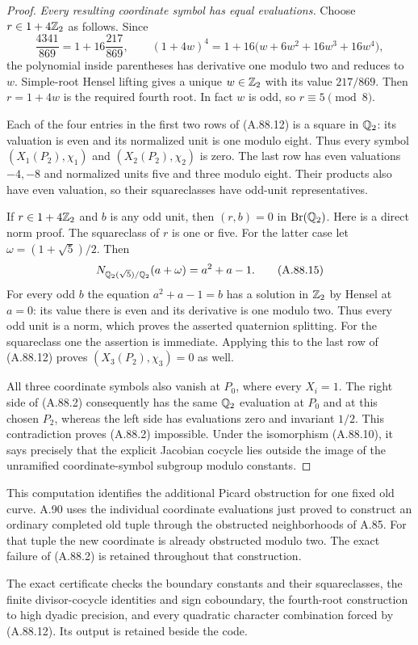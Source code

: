 \begin{proof}
\emph{Every resulting coordinate symbol has equal evaluations.}
Choose $r\in1+4\mathbb Z_2$ as follows.
Since
\[
 \frac{4341}{869}=1+16\frac{217}{869},\qquad
 (1+4w)^4
      =1+16\bigl(w+6w^2+16w^3+16w^4\bigr),
 \tag{A.88.14}
\]
the polynomial inside parentheses has derivative one
modulo two and reduces to $w$.
Simple-root Hensel lifting gives a unique
$w\in\mathbb Z_2$ with its value $217/869$.
Then $r=1+4w$ is the required fourth root.
In fact $w$ is odd, so $r\equiv5\pmod8$.

Each of the four entries in the first two rows of
(A.88.12) is a square in $\mathbb Q_2$:
its valuation is even and its normalized unit is
one modulo eight.
Thus every symbol $(X_1(P_2),\chi_1)$ and
$(X_2(P_2),\chi_2)$ is zero.
The last row has even valuations $-4,-8$ and
normalized units five and three modulo eight.
Their products also have even valuation, so their
squareclasses have odd-unit representatives.

If $r\in1+4\mathbb Z_2$ and $b$ is any odd unit, then
$(r,b)=0$ in $\operatorname{Br}(\mathbb Q_2)$.
Here is a direct norm proof.
The squareclass of $r$ is one or five.
For the latter case let
$\omega=(1+\sqrt5)/2$.
Then
\[
                 N_{\mathbb Q_2(\sqrt5)/\mathbb Q_2}(a+\omega)
                                      =a^2+a-1.
 \tag{A.88.15}
\]
For every odd $b$ the equation
$a^2+a-1=b$ has a solution in $\mathbb Z_2$ by Hensel at
$a=0$: its value there is even and its derivative is
one modulo two.  Thus every odd unit is a norm,
which proves the asserted quaternion splitting.
For the squareclass one the assertion is immediate.
Applying this to the last row of (A.88.12) proves
$(X_3(P_2),\chi_3)=0$ as well.

All three coordinate symbols also vanish at $P_0$,
where every $X_i=1$.
The right side of (A.88.2) consequently has the same
$\mathbb Q_2$ evaluation at $P_0$ and at this chosen $P_2$,
whereas the left side has evaluations zero and
invariant $1/2$.
This contradiction proves (A.88.2) impossible.
Under the isomorphism (A.88.10), it says precisely
that the explicit Jacobian cocycle lies outside the
image of the unramified coordinate-symbol subgroup
modulo constants.
\end{proof}

This computation identifies the additional Picard obstruction
for one fixed old curve.  A.90 uses the individual coordinate
evaluations just proved to construct an ordinary completed old
tuple through the obstructed neighborhoods of A.85.
For that tuple the new coordinate is already obstructed modulo
two.  The exact failure of (A.88.2) is retained throughout
that construction.

The exact certificate 
checks the boundary constants and their squareclasses, the
finite divisor-cocycle identities and sign coboundary,
the fourth-root construction to high dyadic precision,
and every quadratic character combination forced by
(A.88.12).  Its output is retained beside the code.
